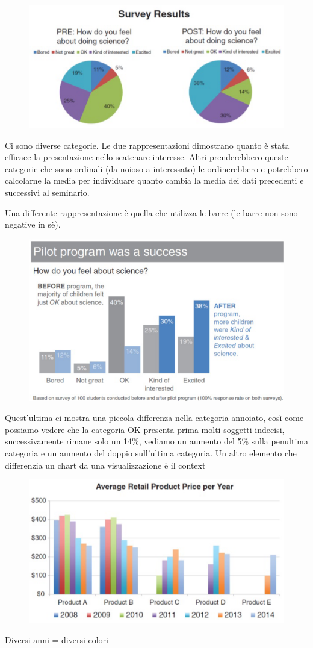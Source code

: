 \documentclass[12pt,a4paper]{report}
\begin{document}
\begin{figure}[h]
	\centering
	\includegraphics[width=.6\textwidth]{imgs datavis/seminario.png}\hfil
	
	\caption{}\label{}
\end{figure}

Ci sono diverse categorie. Le due rappresentazioni dimostrano quanto è stata efficace la presentazione nello scatenare interesse. Altri prenderebbero queste categorie che sono ordinali (da noioso a interessato) le ordinerebbero e potrebbero calcolarne la media per individuare quanto cambia la media dei dati precedenti e successivi al seminario.

Una differente rappresentazione è quella che utilizza le barre (le barre non sono negative in sè).


\begin{figure} [h]
	\centering
	\includegraphics[width=.6\textwidth]{imgs datavis/seminario 1.png}\hfil
	
	\caption{}\label{}
\end{figure}

 Quest'ultima ci mostra una piccola differenza nella categoria annoiato, così come possiamo vedere che la categoria OK presenta prima molti soggetti indecisi, successivamente rimane solo un 14\%, vediamo un aumento del 5\% sulla penultima categoria e un aumento del doppio sull'ultima categoria. Un altro elemento che differenzia un chart da una visualizzazione è il context 


\begin{figure}[h]
	\centering
	\includegraphics[width=.6\textwidth]{imgs datavis/prezzi prodotti .png}\hfil
	
	\caption{}\label{}
\end{figure}
Diversi anni = diversi colori 
\end{document}
